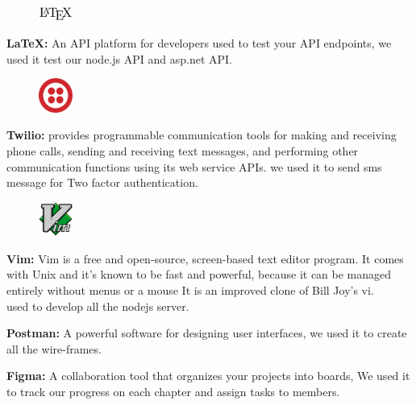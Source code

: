 \documentclass[]{uc2pfecaneva}
\begin{document}
    \begin{figure}
        \includegraphics[width=0.10\textwidth]{images/latex}
        \vspace{-50pt}
    \end{figure} \noindent
    \textbf{LaTeX: }  An API platform for developers used to test your API endpoints,  we used it test our node.js API and asp.net API.

    \clearpage

    \begin{figure}
        \includegraphics[width=0.10\textwidth]{images/twillio}
        \vspace{-40pt}
    \end{figure} \noindent
    \textbf{Twilio: }   provides programmable communication tools for making and receiving phone calls, sending and receiving text messages, and performing other communication functions using its web service APIs.
    we used it to send sms message for Two factor authentication.

    \begin{figure}
        \includegraphics[width=0.10\textwidth]{images/vim}
        \vspace{-30pt}
    \end{figure} \noindent
    \textbf{Vim: }  Vim is a free and open-source, screen-based text editor program.
    It comes with Unix and it's known to be fast and powerful, because it can be managed entirely without menus or a mouse
    It is an improved clone of Bill Joy's vi. \\
    used to develop all the nodejs server.

    \noindent
    \textbf{Postman: }  A powerful software for designing user interfaces, we used it to create all the wire-frames.

    \noindent
    \textbf{Figma: }  A collaboration tool that organizes your projects into boards, We used it to track our progress on each chapter and assign tasks to members.
\end{document}

